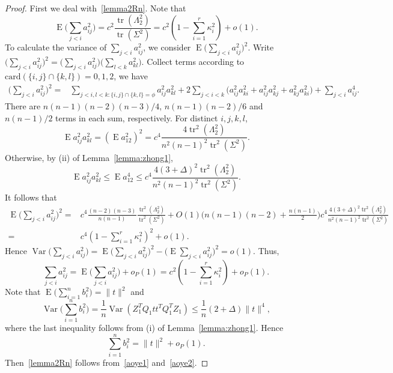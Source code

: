 \documentclass[review]{elsarticle}
\DeclareMathOperator{\mytr}{tr}
\DeclareMathOperator{\myE}{E}
\DeclareMathOperator{\myVar}{Var}
\theoremstyle{plain}
\theoremstyle{definition}
\theoremstyle{remark}
\begin{document}
\begin{proof}
    First we deal with~\eqref{lemma2Rn}. Note that
$$
    \myE \big(\sum_{j<i} a_{ij}^2\big)=c^2 \frac{\mytr(\Lambda_2^2)}{\mytr(\Sigma^2)}=c^2(1-\sum_{i=1}^r \kappa_i^2)+o(1).
$$
    To calculate the variance of $\sum_{j<i} a_{ij}^2$, we consider $\myE \big(\sum_{j<i}a_{ij}^2\big)^2$.
    Write $\big(\sum_{j<i}a_{ij}^2\big)^2=
        \big(\sum_{j<i}a_{ij}^2\big)
        \big(\sum_{l<k}a_{kl}^2\big)$.
    Collect terms according to $\mathrm{card}(\{i,j\}\cap\{k,l\})=0,1,2$, we have
    \begin{equation*}%
    \begin{aligned}
        \big(\sum_{j<i}a_{ij}^2\big)^2
        =&
        \sum_{j<i,l<k:\{i,j\}\cap \{k,l\}=\phi}a_{ij}^2 a_{kl}^2
        +2\sum_{j<i<k}\Big(
        a_{ij}^2 a_{ki}^2+
        a_{ij}^2 a_{kj}^2
        +
        a_{kj}^2 a_{ki}^2
        \Big)
         +
        \sum_{j<i}a_{ij}^4.
    \end{aligned}
    \end{equation*}
    There are  $n(n-1)(n-2)(n-3)/4$, $n(n-1)(n-2)/6$ and $n(n-1)/2$ terms in each sum, respectively.
    For distinct $i,j,k,l$, 
    $$\myE a_{ij}^2 a_{kl}^2=(\myE a_{12}^2)^2=c^4\frac{4\mytr^2(\Lambda_2^2)}{n^2(n-1)^2\mytr^2(\Sigma^2)}.$$
    Otherwise, by (ii) of Lemma~\ref{lemma:zhong1},
    $$\myE a_{ij}^2 a_{kl}^2\leq \myE a_{12}^4\leq c^4\frac{4(3+\Delta)^2\mytr^2(\Lambda_2^2)}{n^2(n-1)^2\mytr^2(\Sigma^2)}.$$
    It follows that
    \begin{equation*}
    \begin{aligned}
        \myE\big(\sum_{j<i}a_{ij}^2\big)^2
            =& c^4\frac{(n-2)(n-3)}{n(n-1)}\frac{\mytr^2 (\Lambda_2^2)}{\mytr^2(\Sigma^2)}
            +
            O(1)\big(n(n-1)(n-2)+\frac{n(n-1)}{2}\big)c^4\frac{4(3+\Delta)^2\mytr^2(\Lambda_2^2)}{n^2(n-1)^2\mytr^2(\Sigma^2)}\\
            =& c^4 (1-\sum_{i=1}^r \kappa_i^2)^2+o(1).
    \end{aligned}
    \end{equation*}
    Hence
    $
    \myVar\big(\sum_{j<i}a_{ij}^2\big)=
    \myE\big(\sum_{j<i}a_{ij}^2\big)^2-
    \big(\myE\sum_{j<i}a_{ij}^2\big)^2=o(1).
    $
    Thus,
    \begin{equation}\label{aoye1}
\sum_{j<i}a_{ij}^2=\myE\big(\sum_{j<i}a_{ij}^2\big)+o_P(1)=c^2(1-\sum_{i=1}^r \kappa_i^2)+o_P(1).
    \end{equation}
Note that
$
\myE \big(\sum_{i=1}^n b_i^2\big)=\|t\|^2
$
and
$$
\myVar \big(\sum_{i=1}^n b_i^2 \big)=\frac{1}{n}\myVar (Z_1^T Q_1 t t^T Q_1^T Z_1)
\leq \frac{1}{n}(2+\Delta)\|t\|^4,
$$
where the last inequality follows from (i) of Lemma~\ref{lemma:zhong1}.
    Hence
    \begin{equation}\label{aoye2}
\sum_{i=1}^n b_i^2=\|t\|^2+o_P(1).
    \end{equation}
    Then~\eqref{lemma2Rn} follows from~\eqref{aoye1} and~\eqref{aoye2}.
    

\end{proof}
\end{document}
